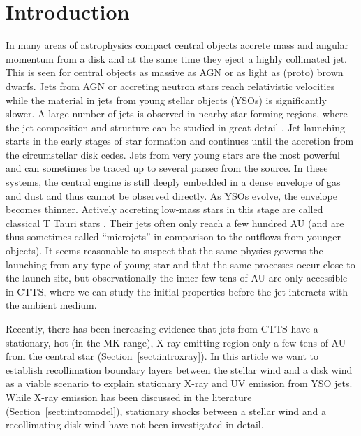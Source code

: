 \documentclass[manuscript]{aastex}
\begin{document}




\section{Introduction} 
In many areas of astrophysics compact central objects accrete mass and angular momentum from a disk and at the same time they eject a highly collimated jet. This is seen for central objects as massive as AGN or as light as (proto) brown dwarfs. Jets from AGN or accreting neutron stars reach relativistic velocities while the material in jets from young stellar objects (YSOs) is significantly slower. 
A large number of jets is observed in nearby star forming regions, where the jet composition and structure can be studied in great detail \citep[see the review by][]{2014arXiv1402.3553F}.
Jet launching starts in the early stages of star formation and continues until the accretion from the circumstellar disk cedes. Jets from very young stars are the most powerful and can sometimes be traced up to several parsec from the source. In these systems, the central engine is still deeply embedded in a dense envelope of gas and dust and thus cannot be observed directly. As YSOs evolve, the envelope becomes thinner. Actively accreting low-mass stars in this stage are called classical T Tauri stars \citep[CTTS -- for a review see][]{2013AN....334...67G}. Their jets often only reach a few hundred AU (and are thus sometimes called ``microjets'' in comparison to the outflows from younger objects).
It seems reasonable to suspect that the same physics governs the launching from any type of young star and that the same processes occur close to the launch site, but observationally the inner few tens of AU are only accessible in CTTS, where we can study the initial properties before the jet interacts with the ambient medium. 

Recently, there has been increasing evidence that jets from CTTS have a stationary, hot (in the MK range), X-ray emitting region only a few tens of AU from the central star (Section~\ref{sect:introxray}). In this article we want to establish recollimation boundary layers between the stellar wind and a disk wind as a viable scenario to explain stationary X-ray and UV emission from YSO jets.
While X-ray emission has been discussed in the literature (Section~\ref{sect:intromodel}), stationary shocks between a stellar wind and a recollimating disk wind have not been investigated in detail. 
\end{document}
